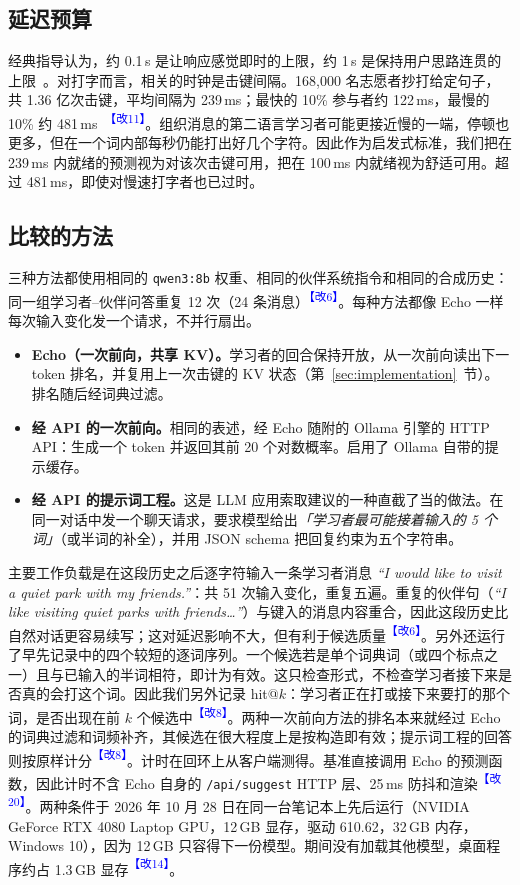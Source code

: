\documentclass[11pt,a4paper,fontset=windows]{ctexart}
\newcommand{\code}[1]{\texttt{#1}}
\newcommand{\audit}[1]{\textcolor{blue}{\textsuperscript{【改#1】}}}
\begin{document}
\subsection{延迟预算}
经典指导认为，约 0.1\,s 是让响应感觉即时的上限，约 1\,s 是保持用户思路连贯的上限~\cite{nielsen,miller,card}。对打字而言，相关的时钟是击键间隔。168,000 名志愿者抄打给定句子，共 1.36 亿次击键，平均间隔为 239\,ms；最快的 10\% 参与者约 122\,ms，最慢的 10\% 约 481\,ms~\cite{dhakal}\audit{11}。组织消息的第二语言学习者可能更接近慢的一端，停顿也更多，但在一个词内部每秒仍能打出好几个字符。因此作为启发式标准，我们把在 239\,ms 内就绪的预测视为对该次击键可用，把在 100\,ms 内就绪视为舒适可用。超过 481\,ms，即使对慢速打字者也已过时。

\subsection{比较的方法}
三种方法都使用相同的 \code{qwen3:8b} 权重、相同的伙伴系统指令和相同的合成历史：同一组学习者--伙伴问答重复 12 次（24 条消息）\audit{6}。每种方法都像 Echo 一样每次输入变化发一个请求，不并行扇出。
\begin{itemize}\setlength{\itemsep}{1pt}
\item \textbf{Echo（一次前向，共享 KV）。}学习者的回合保持开放，从一次前向读出下一 token 排名，并复用上一次击键的 KV 状态（第~\ref{sec:implementation}~节）。排名随后经词典过滤。
\item \textbf{经 API 的一次前向。}相同的表述，经 Echo 随附的 Ollama 引擎的 HTTP API：生成一个 token 并返回其前 20 个对数概率。启用了 Ollama 自带的提示缓存。
\item \textbf{经 API 的提示词工程。}这是 LLM 应用索取建议的一种直截了当的做法。在同一对话中发一个聊天请求，要求模型给出\emph{「学习者最可能接着输入的 5 个词」}（或半词的补全），并用 JSON schema 把回复约束为五个字符串。
\end{itemize}
主要工作负载是在这段历史之后逐字符输入一条学习者消息 \emph{``I would like to visit a quiet park with my friends.''}：共 51 次输入变化，重复五遍。重复的伙伴句（\emph{``I like visiting quiet parks with friends\ldots''}）与键入的消息内容重合，因此这段历史比自然对话更容易续写；这对延迟影响不大，但有利于候选质量\audit{6}。另外还运行了早先记录中的四个较短的逐词序列。一个候选若是单个词典词（或四个标点之一）且与已输入的半词相符，即计为有效。这只检查形式，不检查学习者接下来是否真的会打这个词。因此我们另外记录 hit@$k$：学习者正在打或接下来要打的那个词，是否出现在前 $k$ 个候选中\audit{8}。两种一次前向方法的排名本来就经过 Echo 的词典过滤和词频补齐，其候选在很大程度上是按构造即有效；提示词工程的回答则按原样计分\audit{8}。计时在回环上从客户端测得。基准直接调用 Echo 的预测函数，因此计时不含 Echo 自身的 \code{/api/suggest} HTTP 层、25\,ms 防抖和渲染\audit{20}。两种条件于 2026 年 10 月 28 日在同一台笔记本上先后运行（NVIDIA GeForce RTX 4080 Laptop GPU，12\,GB 显存，驱动 610.62，32\,GB 内存，Windows 10），因为 12\,GB 只容得下一份模型。期间没有加载其他模型，桌面程序约占 1.3\,GB 显存\audit{14}。
\end{document}
